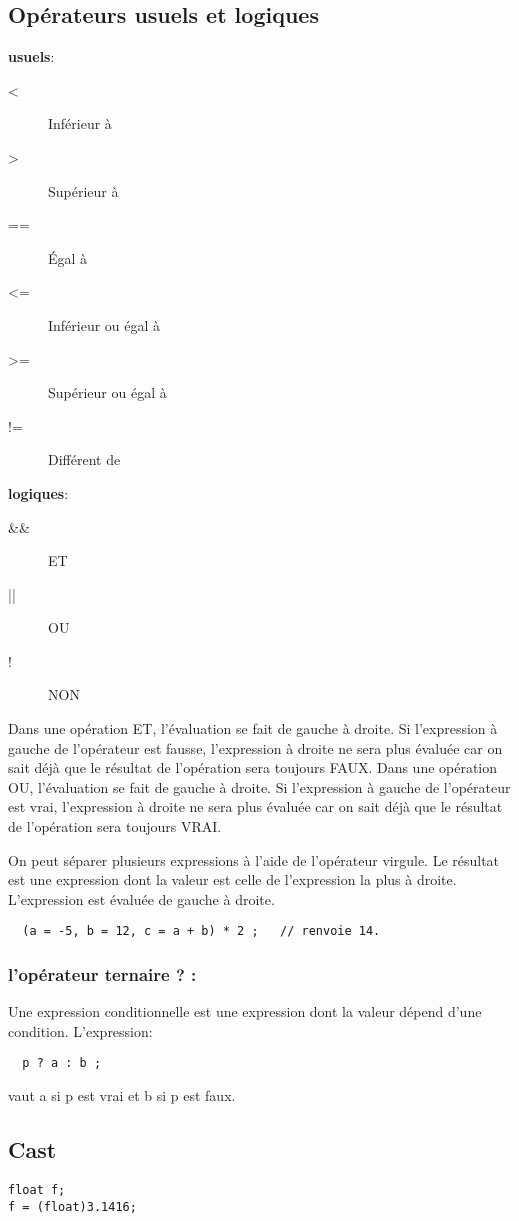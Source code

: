 \documentclass[a4paper]{article}
\begin{document}
\subsection{Opérateurs usuels et logiques}
\textbf{usuels}: %
\begin{description}
  \item [<] 	Inférieur à
  \item [>] 	Supérieur à
  \item [==] 	Égal à
  \item [<=] 	Inférieur ou égal à
  \item [>=] 	Supérieur ou égal à
  \item [!=] 	Différent de
\end{description}
\textbf{logiques}:
\begin{description}
  \item [\&\&] ET
  \item [||] OU
  \item [!] NON
\end{description}
Dans une opération ET, l'évaluation se fait de gauche à droite. Si l'expression à gauche de l'opérateur est fausse, l'expression à droite ne sera plus évaluée car on sait déjà que le résultat de l'opération sera toujours FAUX.\newline
Dans une opération OU, l'évaluation se fait de gauche à droite. Si l'expression à gauche de l'opérateur est vrai, l'expression à droite ne sera plus évaluée car on sait déjà que le résultat de l'opération sera toujours VRAI.


On peut séparer plusieurs expressions à l'aide de l'opérateur virgule. Le résultat est une expression dont la valeur est celle de l'expression la plus à droite. L'expression est évaluée de gauche à droite.
\begin{lstlisting}
  (a = -5, b = 12, c = a + b) * 2 ;   // renvoie 14.
\end{lstlisting}
\subsubsection{l'opérateur ternaire \guillemotleft{}? : \guillemotright{}}
Une expression conditionnelle est une expression dont la valeur dépend d'une condition. L'expression:
\begin{lstlisting}
  p ? a : b ;
\end{lstlisting}
vaut a si p est vrai et b si p est faux.
\subsection{Cast}
\begin{lstlisting}
float f;
f = (float)3.1416;
\end{lstlisting}
\end{document}
